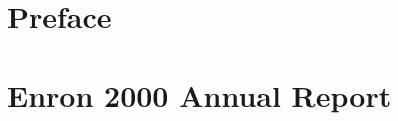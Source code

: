 
\def\BookTitle{Invest by Elimination}
\def\BookAuthor{Ming Lu} %

\def\IndexPageOffset{0}



\chapter*{Preface}
\thispagestyle{plain} %



% 
















%



\newpage
{}
{}
\printglossary[title={Glossary}]

\appendix
\chapter{Enron 2000 Annual Report} \label{appendix:enron_2000_annual_report}

